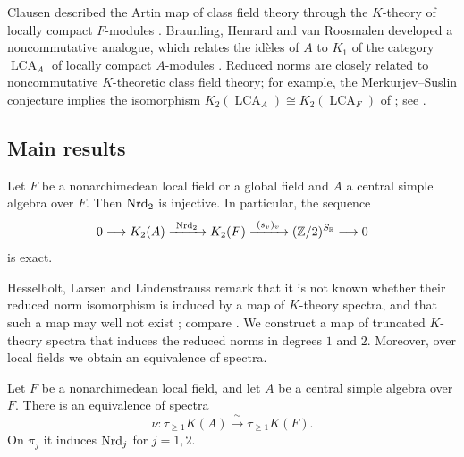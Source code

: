 Clausen described the Artin map of class field theory through the $K$-theory of locally compact $F$-modules \cite{ClausenArtin}.
Braunling, Henrard and van Roosmalen developed a noncommutative analogue, which relates the id\`eles of $A$ to $K_1$ of the category $\operatorname{LCA}_A$ of locally compact $A$-modules \cite{BHRAdeles}.
Reduced norms are closely related to noncommutative $K$-theoretic class field theory; for example, the Merkurjev--Suslin conjecture implies the isomorphism $K_2(\operatorname{LCA}_A)\cong K_2(\operatorname{LCA}_F)$ of \cite[Conjecture 10.2]{BHRAdeles}; see \cite[Theorem 10.5]{BHRAdeles}.


\subsection*{Main results}

\begin{introthm}\label{thm:intro-K2}
Let $F$ be a nonarchimedean local field or a global field and $A$ a central simple algebra over $F$.
Then $\operatorname{Nrd}_2$ is injective.
In particular, the sequence
\[
 0\longrightarrow K_2(A)\xrightarrow{\ \operatorname{Nrd}_2\ }K_2(F)
 \xrightarrow{\ (s_v)_{v}\ }(\mathbb Z/2)^{S_{\mathbb R}}\longrightarrow0
\]
is exact.
\end{introthm}


Hesselholt, Larsen and Lindenstrauss remark that it is not known whether their reduced norm isomorphism is induced by a map of $K$-theory spectra, and that such a map may well not exist \cite[Introduction]{HesselholtLarsenLindenstrauss2020}; compare \cite[Proposition 4]{Merkurjev1995}.
We construct a map of truncated $K$-theory spectra that induces the reduced norms in degrees $1$ and $2$.
Moreover, over local fields we obtain an equivalence of spectra.

\begin{introthm}\label{thm:intro-local}
Let $F$ be a nonarchimedean local field, and let $A$ be a central simple algebra over $F$.
There is an equivalence of spectra
\[
 \nu\colon\tau_{\ge1}K(A)\xrightarrow{\ \sim\ }\tau_{\ge1}K(F).
\]
On $\pi_j$ it induces $\operatorname{Nrd}_j$ for $j=1,2$.
\end{introthm}


